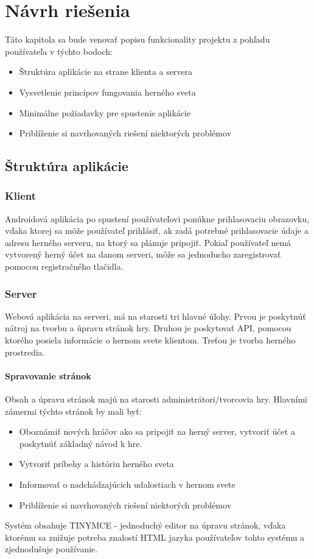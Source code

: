 \chapter{Návrh riešenia}
Táto kapitola sa bude venovať popisu funkcionality projektu z pohľadu používateľa v týchto bodoch:

\begin{itemize}
  \item Štruktúra aplikácie na strane klienta a servera
  \item Vysvetlenie princípov fungovania herného sveta
  \item Minimálne požiadavky pre spustenie aplikácie
  \item Priblíženie si navrhovaných riešení niektorých problémov
\end{itemize}




\section{Štruktúra aplikácie}
\subsection{Klient}
Androidová aplikácia po spustení používateľovi ponúkne prihlasovaciu obrazovku, vďaka ktorej sa môže používateľ prihlásiť, ak zadá potrebné prihlasovacie údaje a adresu herného serveru, na ktorý sa plánuje pripojiť. Pokiaľ používateľ nemá vytvorený herný účet na danom serveri, môže sa jednoducho zaregistrovať pomocou registračného tlačidla.


\subsection{Server}
Webová aplikácia na serveri, má na starosti tri hlavné úlohy. Prvou je poskytnúť nátroj na tvorbu a úpravu stránok hry. Druhou je poskytovať API, pomocou ktorého posiela informácie o hernom svete klientom. Treťou je tvorba herného prostredia.\ 

\subsubsection{Spravovanie stránok}
Obsah a úpravu stránok majú na starosti administrátori/tvorcovia hry. Hlavními zámermi týchto stránok by mali byť:
 \begin{itemize}
  \item Oboznámiť nových hráčov ako sa pripojiť na herný server, vytvoriť účet a poskytnúť základný návod k hre.
  \item Vytvoriť príbehy a históriu herného sveta 
  \item Informovať o nadchádzajúcich udalostiach v hernom svete
  \item Priblíženie si navrhovaných riešení niektorých problémov
\end{itemize}
Systém obsahuje TINYMCE - jednoduchý editor na úpravu stránok, vďaka ktorému sa znižuje potreba znalostí HTML jazyka používateľov tohto systému a zjednodušuje používanie.

